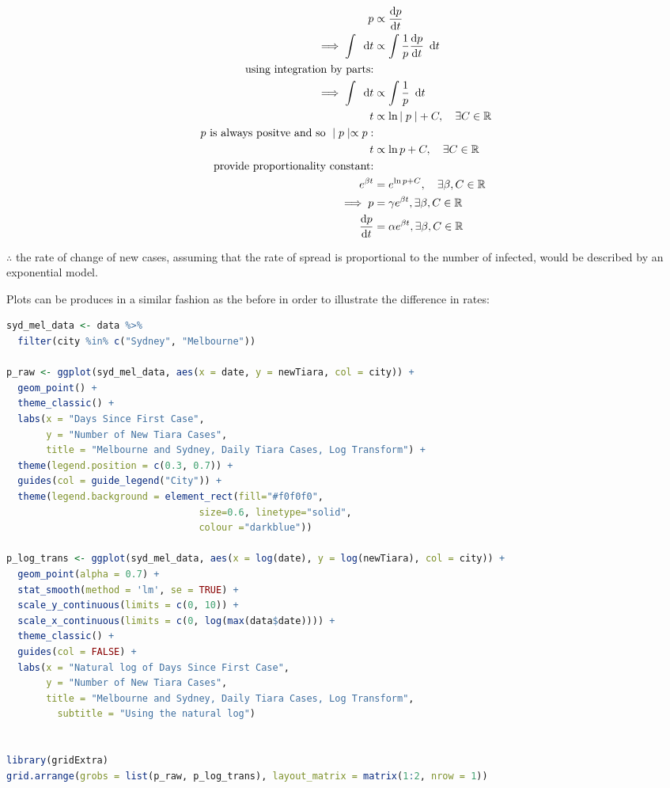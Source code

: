 \documentclass{article}
\begin{document}
\begin{align}
p &\propto \frac{\mathrm{d}p}{\mathrm{d}t} \notag \\
\implies \int  \enspace \mathrm{d}t &\propto \int \frac{1}{p} \frac{\mathrm{d}p}{\mathrm{d}t} \enspace \mathrm{d}t \notag \\
\text{using integration by parts:} \notag \\
\implies \int  \enspace \mathrm{d}t &\propto \int \frac{1}{p} \enspace \mathrm{d}t \notag \\
 t &\propto \ln{\mid p \mid } + C, \quad \exists C \in \mathbb{R} \notag \\
 p \text{ is always positve and so } \mid p \mid \propto p: \notag \\
 t &\propto \ln{ p  } + C, \quad \exists C \in \mathbb{R} \notag \\
 \text{provide proportionality constant:} \notag \\
 e^{\beta t} &= e^{\ln{ p  } + C}, \quad \exists \beta, C \in \mathbb{R}\notag \\
 \implies p &= \gamma e^{\beta t}, \exists \beta, C \in \mathbb{R} \\
\frac{\mathrm{d}p}{\mathrm{d}t} &= \alpha e^{\beta t}, \exists \beta, C \in \mathbb{R}\label{expmod} \\
\end{align}

\(\therefore\) the rate of change of new cases, assuming that the rate
of spread is proportional to the number of infected, would be described
by an exponential model.

Plots can be produces in a similar fashion as the before in order to
illustrate the difference in rates:

\begin{lstlisting}[language=R]
syd_mel_data <- data %>% 
  filter(city %in% c("Sydney", "Melbourne"))

p_raw <- ggplot(syd_mel_data, aes(x = date, y = newTiara, col = city)) +
  geom_point() +
  theme_classic() +
  labs(x = "Days Since First Case",
       y = "Number of New Tiara Cases",
       title = "Melbourne and Sydney, Daily Tiara Cases, Log Transform") +
  theme(legend.position = c(0.3, 0.7)) +
  guides(col = guide_legend("City")) +
  theme(legend.background = element_rect(fill="#f0f0f0",
                                  size=0.6, linetype="solid",
                                  colour ="darkblue"))

p_log_trans <- ggplot(syd_mel_data, aes(x = log(date), y = log(newTiara), col = city)) +
  geom_point(alpha = 0.7) +
  stat_smooth(method = 'lm', se = TRUE) +
  scale_y_continuous(limits = c(0, 10)) +
  scale_x_continuous(limits = c(0, log(max(data$date)))) +
  theme_classic() +
  guides(col = FALSE) +
  labs(x = "Natural log of Days Since First Case",
       y = "Number of New Tiara Cases",
       title = "Melbourne and Sydney, Daily Tiara Cases, Log Transform",
         subtitle = "Using the natural log")


library(gridExtra)
grid.arrange(grobs = list(p_raw, p_log_trans), layout_matrix = matrix(1:2, nrow = 1))
\end{lstlisting}
\end{document}
